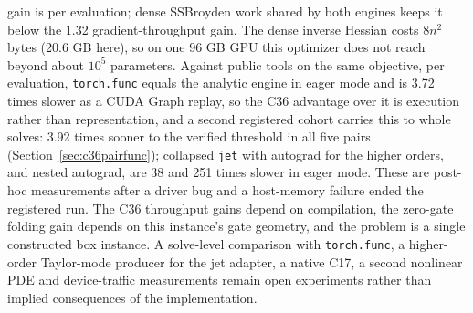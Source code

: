 \documentclass[11pt]{article}
\begin{document}
gain is per evaluation; dense SSBroyden work shared by both engines keeps
it below the 1.32 gradient-throughput gain. The dense inverse Hessian costs
$8n^2$ bytes (20.6 GB here), so on one 96 GB GPU this optimizer does not
reach beyond about $10^5$ parameters. Against public tools on the same
objective, per evaluation, \texttt{torch.func} equals the analytic engine
in eager mode and is 3.72 times slower as a CUDA Graph replay, so the C36
advantage over it is execution rather than representation, and a second
registered cohort carries this to whole solves: 3.92 times sooner to the
verified threshold in all five pairs (Section~\ref{sec:c36pairfunc}); collapsed
\texttt{jet} with autograd for the higher orders, and nested autograd, are
38 and 251 times slower in eager mode. These are post-hoc measurements after
a driver bug and a host-memory failure ended the registered run. The C36 throughput gains depend on compilation, the zero-gate
folding gain depends on this instance's gate geometry, and the problem is a
single constructed box instance. A solve-level comparison with
\texttt{torch.func}, a higher-order Taylor-mode producer for the jet
adapter, a native C17, a second nonlinear PDE and device-traffic measurements remain open
experiments rather than implied consequences of the implementation.
\end{document}
